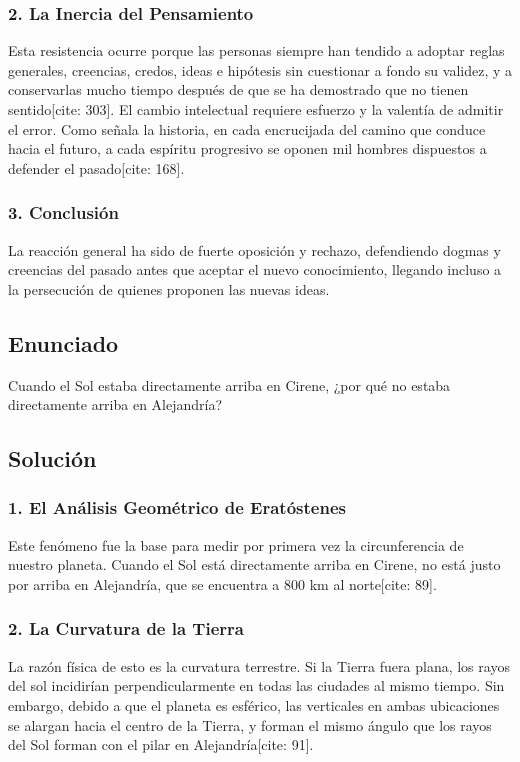 \documentclass[12pt, a4paper]{article}
\begin{document}
\subsubsection*{2. La Inercia del Pensamiento}
Esta resistencia ocurre porque las personas siempre han tendido a adoptar reglas generales, creencias, credos, ideas e hipótesis sin cuestionar a fondo su validez, y a conservarlas mucho tiempo después de que se ha demostrado que no tienen sentido[cite: 303]. El cambio intelectual requiere esfuerzo y la valentía de admitir el error. Como señala la historia, en cada encrucijada del camino que conduce hacia el futuro, a cada espíritu progresivo se oponen mil hombres dispuestos a defender el pasado[cite: 168].

\subsubsection*{3. Conclusión}
La reacción general ha sido de fuerte oposición y rechazo, defendiendo dogmas y creencias del pasado antes que aceptar el nuevo conocimiento, llegando incluso a la persecución de quienes proponen las nuevas ideas.

\newpage

\subsection*{Enunciado}
Cuando el Sol estaba directamente arriba en Cirene, ¿por qué no estaba directamente arriba en Alejandría?

\subsection*{Solución}

\subsubsection*{1. El Análisis Geométrico de Eratóstenes}
Este fenómeno fue la base para medir por primera vez la circunferencia de nuestro planeta. Cuando el Sol está directamente arriba en Cirene, no está justo por arriba en Alejandría, que se encuentra a 800 km al norte[cite: 89].

\subsubsection*{2. La Curvatura de la Tierra}
La razón física de esto es la curvatura terrestre. Si la Tierra fuera plana, los rayos del sol incidirían perpendicularmente en todas las ciudades al mismo tiempo. Sin embargo, debido a que el planeta es esférico, las verticales en ambas ubicaciones se alargan hacia el centro de la Tierra, y forman el mismo ángulo que los rayos del Sol forman con el pilar en Alejandría[cite: 91]. 
\end{document}

